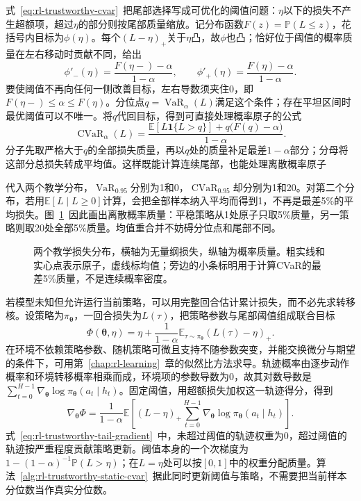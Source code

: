 式~\eqref{eq:rl-trustworthy-cvar}~把尾部选择写成可优化的阈值问题：$\eta$以下的损失不产生超额项，超过$\eta$的部分则按尾部质量缩放。记分布函数$F(z)=\mathbb P(L\leq z)$，花括号内目标为$\phi(\eta)$。每个$(L-\eta)_+$关于$\eta$凸，故$\phi$也凸；恰好位于阈值的概率质量在左右移动时贡献不同，给出
\[
  \phi'_-(\eta)=\frac{F(\eta-)-\alpha}{1-\alpha},
  \qquad
  \phi'_+(\eta)=\frac{F(\eta)-\alpha}{1-\alpha}.
\]
要使阈值不再向任何一侧改善目标，左右导数须夹住0，即
$F(\eta-)\leq\alpha\leq F(\eta)$。分位点$q=\operatorname{VaR}_\alpha(L)$满足这个条件；存在平坦区间时最优阈值可以不唯一。将$q$代回目标，得到可直接处理概率原子的公式
\begin{equation}
  \operatorname{CVaR}_\alpha(L)=
  \frac{\mathbb E[L\mathbf 1\{L>q\}]
       +q\bigl(F(q)-\alpha\bigr)}{1-\alpha}.
  \label{eq:rl-trustworthy-tail-mass}
\end{equation}
分子先取严格大于$q$的全部损失质量，再以$q$处的质量补足最差$1-\alpha$部分；分母将这部分总损失转成平均值。这样既能计算连续尾部，也能处理离散概率原子

代入两个教学分布，$\operatorname{VaR}_{0.95}$分别为1和0，$\operatorname{CVaR}_{0.95}$却分别为1和20。对第二个分布，若用$\mathbb E[L\mid L\geq0]$计算，会把全部样本纳入平均而得到1，不再是最差5\%的平均损失。图~\ref{fig:rl-trustworthy-loss}~因此画出离散概率质量：平稳策略从1处原子只取5\%质量，另一策略则取20处全部5\%质量。均值重合并不妨碍分位点和尾部不同。

\begin{figure}[htbp]
  \centering
  
  \caption{两个教学损失分布，横轴为无量纲损失，纵轴为概率质量。粗实线和实心点表示原子，虚线标均值；旁边的小条标明用于计算CVaR的最差5\%质量，不是连续概率密度。}
  \label{fig:rl-trustworthy-loss}
\end{figure}

若模型未知但允许运行当前策略，可以用完整回合估计累计损失，而不必先求转移核。设策略为$\pi_{\bm{\theta}}$，一回合损失为$L(\tau)$，把策略参数与尾部阈值组成联合目标
\[
  \Phi(\bm{\theta},\eta)
  =\eta+\frac{1}{1-\alpha}
      \mathbb E_{\tau\sim\pi_{\bm{\theta}}}(L(\tau)-\eta)_+.
\]
在环境不依赖策略参数、随机策略可微且支持不随参数突变，并能交换微分与期望的条件下，可用第~\ref{chap:rl-learning}~章的似然比方法求导。轨迹概率由逐步动作概率和环境转移概率相乘而成，环境项的参数导数为0，故其对数导数是
$\sum_{t=0}^{H-1}\nabla_{\bm{\theta}}\log\pi_{\bm{\theta}}(a_t\mid h_t)$。固定阈值，用超额损失加权这一轨迹得分，得到
\begin{equation}
  \nabla_{\bm{\theta}}\Phi
  =\frac{1}{1-\alpha}\mathbb E\left[
    (L-\eta)_+
    \sum_{t=0}^{H-1}\nabla_{\bm{\theta}}
       \log\pi_{\bm{\theta}}(a_t\mid h_t)\right].
  \label{eq:rl-trustworthy-tail-gradient}
\end{equation}
式~\eqref{eq:rl-trustworthy-tail-gradient}~中，未超过阈值的轨迹权重为0，超过阈值的轨迹按严重程度贡献策略更新。阈值本身的一个次梯度为
$1-(1-\alpha)^{-1}\mathbb P(L>\eta)$；在$L=\eta$处可以按$[0,1]$中的权重分配质量。算法~\ref{alg:rl-trustworthy-static-cvar}~据此同时更新阈值与策略，不需要把当前样本分位数当作真实分位数。

